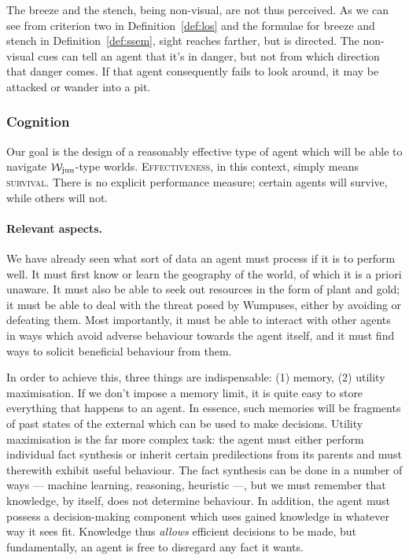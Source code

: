The breeze and the stench, being non-visual, are not thus perceived. As we can see from criterion two in Definition~\ref{def:los} and the formulae for breeze and stench in Definition~\ref{def:ssem}, sight reaches farther, but is directed. The non-visual cues can tell an agent that it's in danger, but not from which direction that danger comes. If that agent consequently fails to look around, it may be attacked or wander into a pit.

\subsubsection{Cognition}

Our goal is the design of a reasonably effective type of agent which will be able to navigate $\mathcal{W}_{\mathrm{jun}}$-type worlds. \textsc{Effectiveness}, in this context, simply means \textsc{survival}. There is no explicit performance measure; certain agents will survive, while others will not.

\paragraph{Relevant aspects.} We have already seen what sort of data an agent must process if it is to perform well. It must first know or learn the geography of the world, of which it is a priori unaware. It must also be able to seek out resources in the form of plant and gold; it must be able to deal with the threat posed by Wumpuses, either by avoiding or defeating them. Most importantly, it must be able to interact with other agents in ways which avoid adverse behaviour towards the agent itself, and it must find ways to solicit beneficial behaviour from them.

In order to achieve this, three things are indispensable: (1) memory, (2) utility maximisation. If we don't impose a memory limit, it is quite easy to store everything that happens to an agent. In essence, such memories will be fragments of past states of the external which can be used to make decisions. Utility maximisation is the far more complex task: the agent must either perform individual fact synthesis or inherit certain predilections from its parents and must therewith exhibit useful behaviour. The fact synthesis can be done in a number of ways --- machine learning, reasoning, heuristic ---, but we must remember that knowledge, by itself, does not determine behaviour. In addition, the agent must possess a decision-making component which uses gained knowledge in whatever way it sees fit. Knowledge thus  {\em allows} efficient decisions to be made, but fundamentally, an agent is free to disregard any fact it wants.

